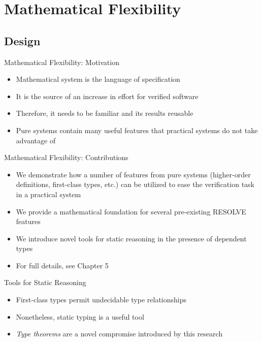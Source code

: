 \section{Mathematical Flexibility}

\lstset{
	basicstyle=\footnotesize
}


\subsection{Design}
\begin{frame}{Mathematical Flexibility: Motivation}
	\begin{itemize}
		\item Mathematical system is the language of specification
		\item It is the source of an increase in effort for verified software
		\item Therefore, it needs to be familiar and its results reusable
		\item Pure systems contain many useful features that practical systems do not take advantage of
	\end{itemize}
\end{frame}

\begin{frame}{Mathematical Flexibility: Contributions}
	\begin{itemize}
		\item We demonstrate how a number of features from pure systems (higher-order definitions, first-class types, etc.) can be utilized to ease the verification task in a practical system
		\item We provide a mathematical foundation for several pre-existing RESOLVE features
		\item We introduce novel tools for static reasoning in the presence of dependent types
		\item For full details, see Chapter 5
	\end{itemize}
\end{frame}



\begin{frame}{Tools for Static Reasoning}
	\begin{itemize}
		\item First-class types permit undecidable type relationships
		\item Nonetheless, static typing is a useful tool
		\item \emph{Type theorems} are a novel compromise introduced by this research
	\end{itemize}
	\vspace{2em}
	
\end{frame}

